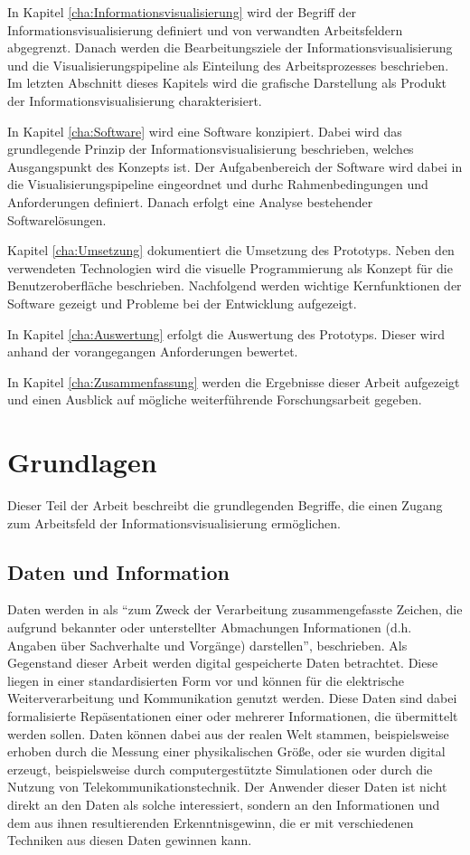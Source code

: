 \documentclass[a4paper, 12pt, DIV=calc, version=first, pdftex, headsepline, footsepline, bibtotocnumbered, liststotocnumbered]{scrreprt}
\begin{document}
In Kapitel \ref{cha:Informationsvisualisierung} wird der Begriff der Informationsvisualisierung
definiert und von verwandten Arbeitsfeldern abgegrenzt. Danach werden die Bearbeitungsziele
der Informationsvisualisierung und die Visualisierungspipeline als Einteilung des Arbeitsprozesses
beschrieben. Im letzten Abschnitt dieses Kapitels wird die grafische Darstellung als Produkt
der Informationsvisualisierung charakterisiert.

In Kapitel \ref{cha:Software} wird eine Software konzipiert.
Dabei wird das grundlegende Prinzip der Informationsvisualisierung beschrieben, welches Ausgangspunkt
des Konzepts ist. Der Aufgabenbereich der Software wird dabei in die Visualisierungspipeline eingeordnet
und durhc Rahmenbedingungen und Anforderungen definiert. Danach erfolgt eine Analyse bestehender
Softwarelösungen.

Kapitel \ref{cha:Umsetzung} dokumentiert die Umsetzung des Prototyps. Neben den verwendeten
Technologien wird die visuelle Programmierung als Konzept für die Benutzeroberfläche beschrieben.
Nachfolgend werden wichtige Kernfunktionen der Software gezeigt und Probleme bei der Entwicklung
aufgezeigt.

In Kapitel \ref{cha:Auswertung} erfolgt die Auswertung des Prototyps. Dieser wird anhand der
vorangegangen Anforderungen bewertet.

In Kapitel \ref{cha:Zusammenfassung} werden die Ergebnisse dieser Arbeit aufgezeigt und einen
Ausblick auf mögliche weiterführende Forschungsarbeit gegeben.

\chapter{Grundlagen}
\label{cha:Grundlagen}
Dieser Teil der Arbeit beschreibt die grundlegenden Begriffe, die einen Zugang
zum Arbeitsfeld der Informationsvisualisierung ermöglichen.
\section{Daten und Information}
\label{sec:DatenInfo}
Daten werden in \citep{Gabler} als "`zum Zweck der Verarbeitung zusammengefasste Zeichen,
die aufgrund bekannter oder unterstellter Abmachungen
Informationen (d.h. Angaben über Sachverhalte und Vorgänge) darstellen"', beschrieben.
Als Gegenstand dieser Arbeit werden digital gespeicherte Daten betrachtet.
Diese liegen in einer standardisierten Form vor und können für die elektrische Weiterverarbeitung
und Kommunikation genutzt werden. Diese Daten sind dabei formalisierte Repäsentationen einer
oder mehrerer Informationen, die übermittelt werden sollen.
Daten können dabei aus der realen Welt stammen, beispielsweise erhoben durch
die Messung einer physikalischen Größe, oder sie wurden digital erzeugt, beispielsweise durch
computergestützte Simulationen oder durch die Nutzung von Telekommunikationstechnik.
Der Anwender dieser Daten ist nicht direkt an den Daten als solche interessiert, sondern
an den Informationen und dem aus ihnen resultierenden Erkenntnisgewinn, die er mit verschiedenen
Techniken aus diesen Daten gewinnen kann.
\end{document}
